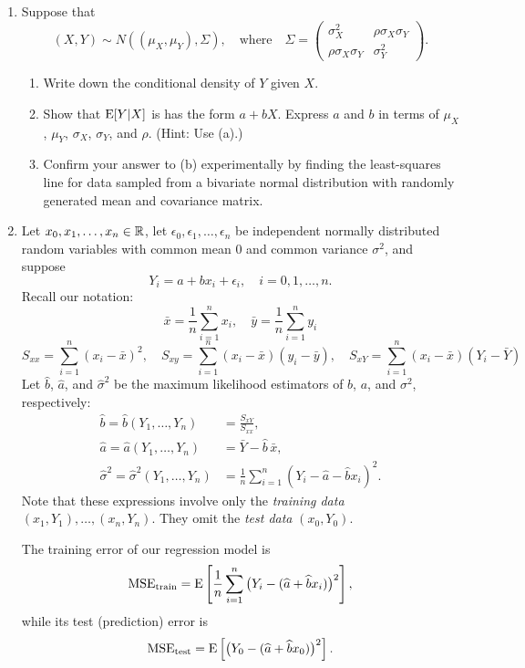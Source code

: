 \documentclass[12pt]{amsart}
\begin{document}
\begin{enumerate}
    \item Suppose that
    \[
(X,Y)\sim N((\mu_X, \mu_Y), \Sigma),\quad\text{where}\quad
\Sigma=\begin{pmatrix}\sigma_X^2&\rho\sigma_X\sigma_Y\\\rho\sigma_X\sigma_Y&\sigma_Y^2\end{pmatrix}.
    \]
    \begin{enumerate}
        \setlength{\itemsep}{0.5em}
        \item Write down the conditional density of $Y$ given $X$.
        \item Show that $\operatorname{E}[Y|X]$ is has the form $a+bX$.
        Express $a$ and $b$ in terms of $\mu_X$, $\mu_Y$, $\sigma_X$, $\sigma_Y$, and $\rho$.
        (Hint: Use (a).)
        \item Confirm your answer to (b) experimentally by finding the least-squares line for data
        sampled from a bivariate normal distribution with randomly generated mean and
        covariance matrix. 
    \end{enumerate}

    \item Let $x_0,x_1,\ldots,x_n\in\mathbb{R}$, let $\epsilon_0,\epsilon_1,\ldots,\epsilon_n$ be independent 
    normally distributed random variables with common mean $0$ and common variance $\sigma^2$,
    and suppose
    \[
        Y_i = a + bx_i + \epsilon_i,\quad i=0,1,\ldots,n.
    \]
    Recall our notation:
    \[
        \bar x = \frac1n\sum_{i=1}^n x_i,\quad \bar y = \frac1n\sum_{i=1}^n y_i
    \]
    \[
        S_{xx} = \sum_{i=1}^n (x_i - \bar x)^2,\quad
        S_{xy} = \sum_{i=1}^n(x_i-\bar x)(y_i - \bar y),\quad
        S_{xY} = \sum_{i=1}^n(x_i-\bar x)(Y_i - \bar Y)
    \]
    Let $\hat b$, $\hat a$, and $\hat \sigma^2$ be the maximum likelihood estimators of
    $b$, $a$, and $\sigma^2$, respectively:
    \begin{align*}
        \hat{b}=\hat{b}(Y_1,\ldots,Y_n) &= \frac{S_{xY}}{S_{xx}},\\
        \hat{a}=\hat{a}(Y_1,\ldots,Y_n) &=   \bar Y - \hat b\, \bar x,\\
        \hat{\sigma}^2=\hat{\sigma}^2(Y_1,\ldots,Y_n)
        &= \frac 1 n\sum_{i=1}^n (Y_i - \hat a - \hat b x_i)^2.
    \end{align*}
    Note that these expressions involve only the \emph{training data} $(x_1,Y_1),\ldots,(x_n,Y_n)$.
    They omit the \emph{test data} $(x_0, Y_0)$.
    
    The training error of our regression model is
    \[
        \operatorname{MSE}_\text{train} = \operatorname{E}\left[\frac1n\sum_{i=1}^n \big(Y_i -(\widehat a + \widehat b x_i)\big)^2\right],
    \]
    while its test (prediction) error is
    \[
        \operatorname{MSE}_{\text{test}} = \operatorname{E}\left[\big(Y_0 - (\widehat a + \widehat b x_0)\big)^2\right].
    \]
    

\end{enumerate}
\end{document}
